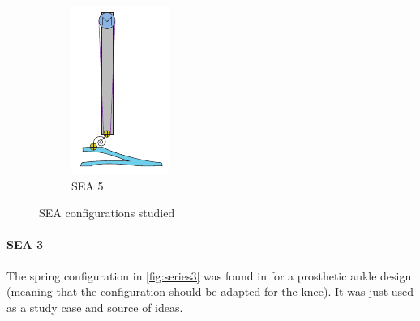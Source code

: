 \begin{figure}[h]
\begin{subfigure}{.19\textwidth}
    \includegraphics[width=\linewidth]{figures/illustration_serial_rotational.pdf}
    \caption{SEA 5}
    \label{fig:series5}
  \end{subfigure}
  \caption{SEA configurations studied}
  \label{fig:compliance_series}
\end{figure}  

\paragraph{SEA 3} %
\label{par:sea_3}
The spring configuration in \ref{fig:series3} was found in \cite{grimmer} for a prosthetic ankle design (meaning that the configuration should be adapted for the knee).
It was just used as a study case and source of ideas. 

